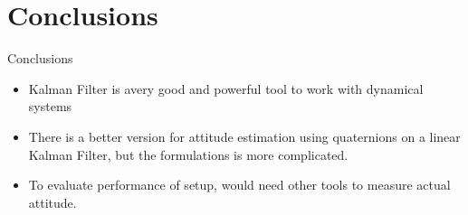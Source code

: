 \section{Conclusions}
\begin{frame}{Conclusions}
\begin{itemize}
\item Kalman Filter is avery good and powerful tool to work with dynamical systems
\item There is a better version for attitude estimation using quaternions on a linear Kalman Filter, but the formulations is more complicated.
\item To evaluate performance of setup, would need other tools to measure actual attitude.
\end{itemize}
\end{frame}